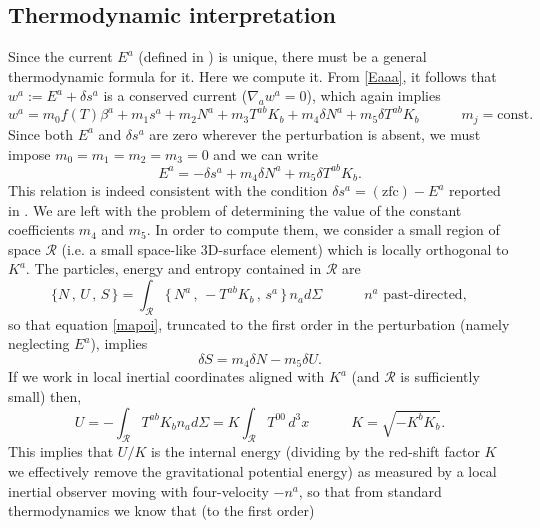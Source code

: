 \documentclass[aps,prl,reprint,nofootinbib]{revtex4-1}
\newcommand{\spc}{\quad \quad \quad}
\begin{document}
\subsection{Thermodynamic interpretation}

Since the current $E^a$ (defined in \cite{GavassinoGibbs2021}) is unique, there must be a general thermodynamic formula for it. Here we compute it. From \eqref{Eaaa}, it follows that $w^a:= E^a+\delta s^a$ is a conserved current ($\nabla_a w^a=0$), which again implies
\begin{equation}
w^a =m_0 f(T) \beta^a + m_1 s^a +m_2 N^a +m_3 T^{ab} K_b + m_4 \delta N^a + m_5 \delta T^{ab} K_b  \spc  m_j=\text{const}.
\end{equation} 
Since both $E^a$ and $\delta s^a$ are zero wherever the perturbation is absent, we must impose $m_0 =m_1=m_2=m_3=0$ and we can write
\begin{equation}\label{mapoi}
E^a =-\delta s^a +m_4 \delta N^a + m_5 \delta T^{ab} K_b. 
\end{equation}
This relation is indeed consistent with the condition $\delta s^a = (\text{zfc})-E^a$ reported in \cite{GavassinoGibbs2021}. We are left with the problem of determining the value of the constant coefficients $m_4$ and $m_5$. In order to compute them, we consider a small region of space $\mathcal{R}$ (i.e. a small space-like 3D-surface element) which is locally orthogonal to $K^a$. The particles, energy and entropy contained in $\mathcal{R}$ are
\begin{equation}
\{ N \, , \, U \, , \,S \,  \}= \int_{\mathcal{R}} \{ \, N^a \, , \, - T^{ab} K_b \, ,  \,  s^a \,    \} \, n_a d\Sigma  \spc n^a \text{ past-directed},
\end{equation} 
so that equation \eqref{mapoi}, truncated to the first order in the perturbation (namely neglecting $E^a$), implies
\begin{equation}\label{m4m5}
\delta S = m_4 \delta N-m_5 \delta U. 
\end{equation}
If we work in local inertial coordinates aligned with $K^a$ (and $\mathcal{R}$ is sufficiently small) then,
\begin{equation}
U = - \int_{\mathcal{R}}  T^{ab} K_b n_a d\Sigma = K \int_{\mathcal{R}}  T^{00}  \, d^3 x   \spc  K= \sqrt{-K^b K_b}.
\end{equation}
This implies that $U/K$ is the internal energy (dividing by the red-shift factor $K$ we effectively remove the gravitational potential energy) as measured by a local inertial observer moving with four-velocity $-n^a$, so that from standard thermodynamics we know that (to the first order)
\end{document}
